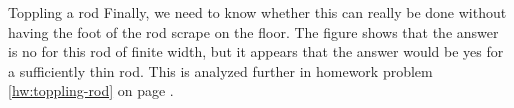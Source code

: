 \begin{eg}{Toppling a rod}
Finally, we need to know whether this can really be done without having the
foot of the rod scrape on the floor. The figure shows that the answer is no
for this rod of finite width, but it appears that the answer would be yes for
a sufficiently thin rod. This is analyzed further in homework problem \ref{hw:toppling-rod}
on page \pageref{hw:toppling-rod}.

\end{eg}
